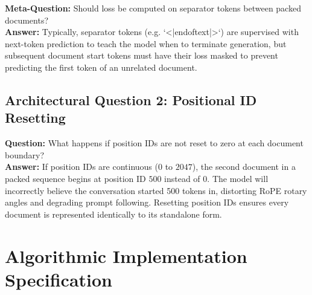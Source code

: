 \documentclass[11pt,a4paper]{article}
\theoremstyle{definition}
\begin{document}
\textbf{Meta-Question:} Should loss be computed on separator tokens between packed documents?\\
\textbf{Answer:} Typically, separator tokens (e.g. `<|endoftext|>`) are supervised with next-token prediction to teach the model when to terminate generation, but subsequent document start tokens must have their loss masked to prevent predicting the first token of an unrelated document.

\subsection{Architectural Question 2: Positional ID Resetting}
\textbf{Question:} What happens if position IDs are not reset to zero at each document boundary?\\
\textbf{Answer:} If position IDs are continuous ($0$ to $2047$), the second document in a packed sequence begins at position ID $500$ instead of $0$. The model will incorrectly believe the conversation started 500 tokens in, distorting RoPE rotary angles and degrading prompt following. Resetting position IDs ensures every document is represented identically to its standalone form.

\section{Algorithmic Implementation Specification}
\end{document}
